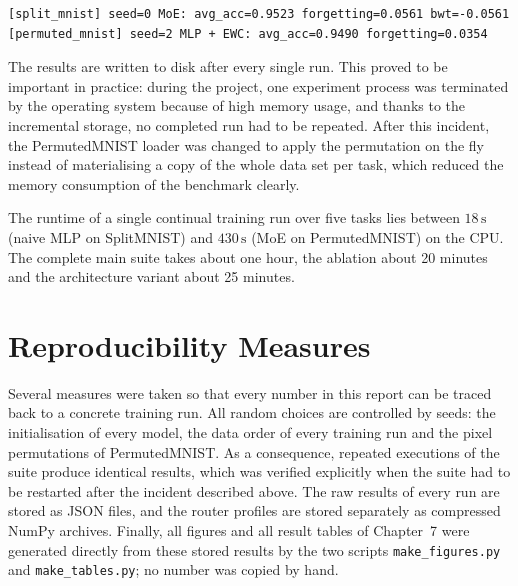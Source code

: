 \begin{lstlisting}[caption={Example lines of the experiment log.},
label={lst:log}]
[split_mnist] seed=0 MoE: avg_acc=0.9523 forgetting=0.0561 bwt=-0.0561
[permuted_mnist] seed=2 MLP + EWC: avg_acc=0.9490 forgetting=0.0354
\end{lstlisting}

The results are written to disk after every single run. This proved to be
important in practice: during the project, one experiment process was
terminated by the operating system because of high memory usage, and thanks
to the incremental storage, no completed run had to be repeated. After this
incident, the PermutedMNIST loader was changed to apply the permutation on
the fly instead of materialising a copy of the whole data set per task,
which reduced the memory consumption of the benchmark clearly.

The runtime of a single continual training run over five tasks lies between
$18\,\mathrm{s}$ (naive MLP on SplitMNIST) and $430\,\mathrm{s}$ (MoE on
PermutedMNIST) on the CPU. The complete main suite takes about one hour,
the ablation about 20 minutes and the architecture variant about 25
minutes.

\section{Reproducibility Measures}
\label{sec:reproducibility}

Several measures were taken so that every number in this report can be
traced back to a concrete training run. All random choices are controlled
by seeds: the initialisation of every model, the data order of every
training run and the pixel permutations of PermutedMNIST. As a consequence,
repeated executions of the suite produce identical results, which was
verified explicitly when the suite had to be restarted after the incident
described above. The raw results of every run are stored as JSON files, and
the router profiles are stored separately as compressed NumPy archives.
Finally, all figures and all result tables of Chapter~7 were generated
directly from these stored results by the two scripts
\texttt{make\_figures.py} and \texttt{make\_tables.py}; no number was
copied by hand.
